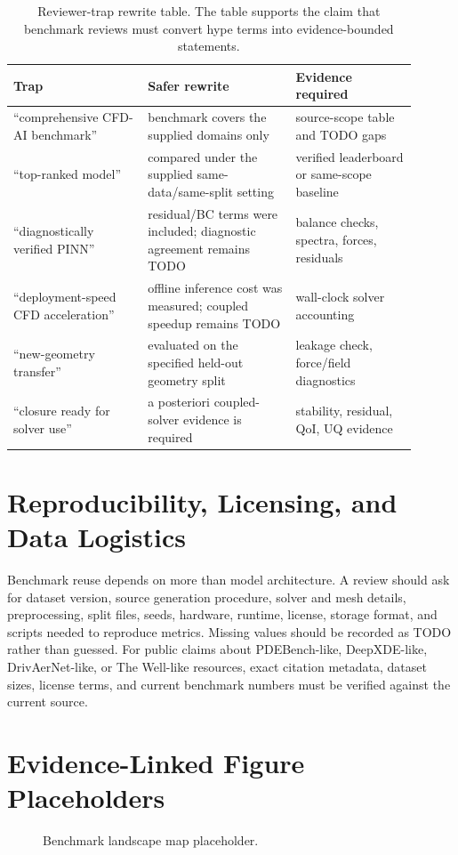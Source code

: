 \documentclass[11pt]{article}
\begin{document}
\begin{table}[h]
\centering
\small
\begin{tabular}{p{0.30\linewidth}p{0.33\linewidth}p{0.27\linewidth}}
\toprule
Trap & Safer rewrite & Evidence required \\
\midrule
``comprehensive CFD-AI benchmark'' & benchmark covers the supplied domains only & source-scope table and TODO gaps \\
``top-ranked model'' & compared under the supplied same-data/same-split setting & verified leaderboard or same-scope baseline \\
``diagnostically verified PINN'' & residual/BC terms were included; diagnostic agreement remains TODO & balance checks, spectra, forces, residuals \\
``deployment-speed CFD acceleration'' & offline inference cost was measured; coupled speedup remains TODO & wall-clock solver accounting \\
``new-geometry transfer'' & evaluated on the specified held-out geometry split & leakage check, force/field diagnostics \\
``closure ready for solver use'' & a posteriori coupled-solver evidence is required & stability, residual, QoI, UQ evidence \\
\bottomrule
\end{tabular}
\caption{Reviewer-trap rewrite table. The table supports the claim that benchmark reviews must convert hype terms into evidence-bounded statements.}
\end{table}

\section{Reproducibility, Licensing, and Data Logistics}
Benchmark reuse depends on more than model architecture. A review should ask for dataset version, source generation procedure, solver and mesh details, preprocessing, split files, seeds, hardware, runtime, license, storage format, and scripts needed to reproduce metrics. Missing values should be recorded as TODO rather than guessed. For public claims about PDEBench-like, DeepXDE-like, DrivAerNet-like, or The Well-like resources, exact citation metadata, dataset sizes, license terms, and current benchmark numbers must be verified against the current source.

\section{Evidence-Linked Figure Placeholders}
\begin{figure}[h]
\centering
{}
\caption{Benchmark landscape map placeholder.}
\end{figure}
\end{document}
